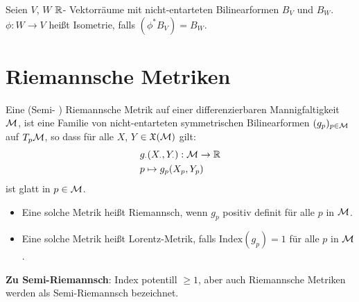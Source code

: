 \begin{defs}[Isometrie]
Seien $V$, $W$ $\mathbb{R}$- Vektorräume mit nicht-entarteten Bilinearformen $B_V$ und $B_W$.
$\phi: W \to V$ heißt Isometrie, falls $(\phi^\ast B_V) = B_W$.
\end{defs}

\section{Riemannsche Metriken}

\begin{defs}
Eine (Semi- ) Riemannsche Metrik auf einer differenzierbaren Mannigfaltigkeit $\mathcal{M}$, ist eine Familie von nicht-entarteten symmetrischen Bilinearformen 
$(g_p)_{p \in \mathcal{M}}$ auf $T_p \mathcal{M}$, so dass für alle $X$, $Y$ $\in \mathfrak{X}(\mathcal{M})$ gilt:
\begin{align}
&g_{\cdot} (X_\cdot, Y_\cdot): \mathcal{M} \to \mathbb{R} \\
& p \mapsto g_p (X_p, Y_p)
\end{align}
ist glatt in $p \in \mathcal{M}$.
\end{defs}


\begin{bem}\leavevmode
\begin{itemize}
\item Eine solche Metrik heißt Riemannsch, wenn $g_p$ positiv definit für alle $p$ in $\mathcal{M}$.
\item Eine solche Metrik heißt Lorentz-Metrik, falls $\mathrm{Index} (g_p) = 1$ für alle $p$ in $\mathcal{M}$.
\end{itemize}
\end{bem}

\textbf{Zu Semi-Riemannsch}:
Index potentill $\geq 1$, aber auch Riemannsche Metriken werden als Semi-Riemannsch bezeichnet.



